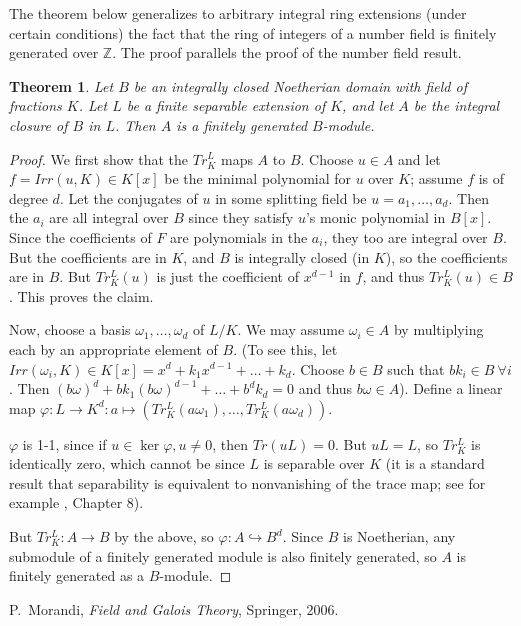 \documentclass[12pt]{article}
\newcommand{\Ints}{\mathbb{Z}}
\newtheorem{thm}{Theorem}
\begin{document}
The theorem below generalizes to arbitrary integral ring extensions (under certain conditions) the fact that the ring of integers of a number field is finitely generated over $\Ints$. The proof parallels the proof of the number field result.

\begin{thm} Let $B$ be an integrally closed Noetherian domain with field of fractions $K$. Let $L$ be a finite separable extension of $K$, and let $A$ be the integral closure of $B$ in $L$. Then $A$ is a finitely generated $B$-module.
\end{thm}

\begin{proof}
We first show that the  $Tr^L_K$ maps $A$ to $B$. Choose $u\in A$ and let $f=Irr(u,K)\in K[x]$ be the minimal polynomial for $u$ over $K$; assume $f$ is of degree $d$. Let the conjugates of $u$ in some splitting field be $u=a_1,\ldots,a_d$. Then the $a_i$ are all integral over $B$ since they satisfy $u$'s monic polynomial in $B[x]$. Since the coefficients of $F$ are polynomials in the $a_i$, they too are integral over $B$. But the coefficients are in $K$, and $B$ is integrally closed (in $K$), so the coefficients are in $B$. But $Tr^L_K(u)$ is just the coefficient of $x^{d-1}$ in $f$, and thus $Tr^L_K(u)\in B$. This proves the claim.

Now, choose a basis $\omega_1,\ldots,\omega_d$ of $L/K$. We may assume $\omega_i\in A$ by multiplying each by an appropriate element of $B$. (To see this, let $Irr(\omega_i,K)\in K[x] = x^d+k_1x^{d-1}+\ldots+k_d$. Choose $b\in B$ such that $bk_i\in B\ \forall i$. Then $(b\omega)^d+bk_1(b\omega)^{d-1}+\ldots+b^dk_d=0$ and thus $b\omega\in A$). Define a linear map $\varphi:L\rightarrow K^d:a\mapsto(Tr^L_K (a\omega_1),\ldots,Tr^L_K (a\omega_d))$. 

$\varphi$ is 1-1, since if $u\in\ker\varphi, u\neq 0$, then $Tr(uL)=0$. But $uL=L$, so $Tr^L_K$ is identically zero, which cannot be since $L$ is separable over $K$ (it is a standard result that separability is equivalent to nonvanishing of the trace map; see for example \cite{bib:morandi}, Chapter 8). 

But $Tr^L_K:A\rightarrow B$ by the above, so $\varphi:A\hookrightarrow B^d$. Since $B$ is Noetherian, any submodule of a finitely generated module is also finitely generated, so $A$ is finitely generated as a $B$-module.
\end{proof}

\begin{thebibliography}{10}
P.~Morandi, \emph{Field and Galois Theory}, Springer, 2006.
\end{thebibliography}
\end{document}
